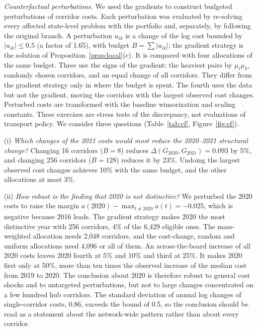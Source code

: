 \documentclass[12pt]{article}
\theoremstyle{definition}
\begin{document}
\emph{Counterfactual perturbations.} We used the gradients to construct budgeted perturbations of corridor costs. Each perturbation was evaluated by re-solving every affected state-level problem with the portfolio and, separately, by following the original branch. A perturbation $u_{ik}$ is a change of the log cost bounded by $|u_{ik}|\le0.5$ (a factor of 1.65), with budget $B=\sum|u_{ik}|$; the gradient strategy is the solution of Proposition~\ref{prop:local}(c). It is compared with four allocations of the same budget. Three use the signs of the gradient: the heaviest pairs by $\mu_i\mu_k$, randomly chosen corridors, and an equal change of all corridors. They differ from the gradient strategy only in where the budget is spent. The fourth uses the data but not the gradient, moving the corridors with the largest observed cost changes. Perturbed costs are transformed with the baseline winsorization and scaling constants. These exercises are stress tests of the discrepancy, not evaluations of transport policy. We consider three questions (Table~\ref{tab:cf}, Figure~\ref{fig:cf}).

(i) \emph{Which changes of the 2021 costs would most reduce the 2020--2021 structural change?} Changing 16 corridors ($B=8$) reduces $\Delta(G_{2020},G_{2021})=0.093$ by 5\%, and changing 256 corridors ($B=128$) reduces it by 23\%. Undoing the largest observed cost changes achieves 10\% with the same budget, and the other allocations at most 3\%.

(ii) \emph{How robust is the finding that 2020 is not distinctive?} We perturbed the 2020 costs to raise the margin $a(2020)-\max_{t\neq2020}a(t)=-0.025$, which is negative because 2016 leads. The gradient strategy makes 2020 the most distinctive year with 256 corridors, 4\% of the 6{,}429 eligible ones. The mass-weighted allocation needs 2{,}048 corridors, and the cost-change, random and uniform allocations need 4{,}096 or all of them. An across-the-board increase of all 2020 costs leaves 2020 fourth at 5\% and 10\% and third at 25\%. It makes 2020 first only at 50\%, more than ten times the observed increase of the median cost from 2019 to 2020. The conclusion about 2020 is therefore robust to general cost shocks and to untargeted perturbations, but not to large changes concentrated on a few hundred hub corridors. The standard deviation of annual log changes of single-corridor costs, 0.86, exceeds the bound of 0.5, so the conclusion should be read as a statement about the network-wide pattern rather than about every corridor.
\end{document}
